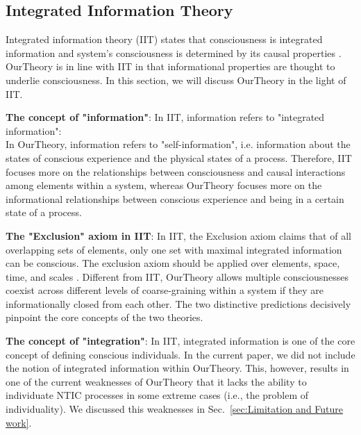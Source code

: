 \documentclass[utf8]{article}
\begin{document}
        
		\subsection{Integrated Information Theory}
            Integrated information theory (IIT) states that consciousness is integrated information and system's consciousness is determined by its causal properties \citep{tononi2016integrated}. \ac{OurTheory} is in line with IIT in that informational properties are thought to underlie consciousness. In this section, we will discuss \ac{OurTheory} in the light of IIT. 
            
            \textbf{The concept of "information"}: In IIT, information refers to "integrated information":\\  In \ac{OurTheory}, information refers to "self-information", i.e. information about the states of conscious experience and the physical states of a process. Therefore, IIT focuses more on the relationships between consciousness and causal interactions among elements within a system, whereas \ac{OurTheory} focuses more on the informational relationships between conscious experience and being in a certain state of a process. 
		    
		    \textbf{The "Exclusion" axiom in IIT}: In IIT, the Exclusion axiom claims that of all overlapping sets of elements, only one set with maximal integrated information can be conscious. The exclusion axiom should be applied over elements, space, time, and scales \citep{oizumi2014phenomenology, hoel2016can}. Different from IIT, \ac{OurTheory} allows multiple consciousnesses coexist across different levels of coarse-graining within a system if they are informationally closed from each other. The two distinctive predictions decisively pinpoint the core concepts of the two theories. 

		    \textbf{The concept of "integration"}: In IIT, integrated information is one of the core concept of defining conscious individuals. In the current paper, we did not include the notion of integrated information within \ac{OurTheory}. This, however, results in one of the current weaknesses of \ac{OurTheory} that it lacks the ability to individuate NTIC processes in some extreme cases (i.e., the problem of individuality). We discussed this weaknesses in Sec.~\ref{sec:Limitation and Future work}.
		    
\end{document}
